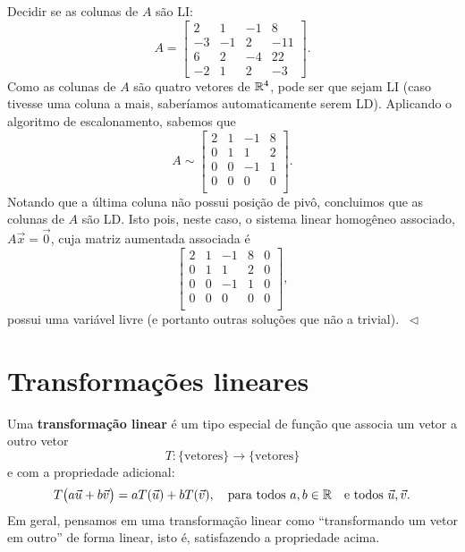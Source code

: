 \documentclass[../livro.tex]{subfiles}
\begin{document}
\begin{example}
Decidir se as colunas de $A$ são LI:
\begin{equation}
A = \left[
\begin{array}{rrrr}
   2&1&-1&8\\
   -3&-1&2&-11\\
   6&2&-4&22\\
   -2&1&2&-3
\end{array}
\right].
\end{equation} Como as colunas de $A$ são quatro vetores de $\mathbb{R}^4$, pode ser que sejam LI (caso tivesse uma coluna a mais, saberíamos automaticamente serem LD). Aplicando o algoritmo de escalonamento, sabemos que
\begin{equation}
A \sim \left[
\begin{array}{cccc}
   2&1&-1&8\\
   0&1&1&2\\
   0&0&-1&1\\
   0&0&0&0\\
\end{array}
\right].
\end{equation} Notando que a última coluna não possui posição de pivô, concluimos que as colunas de $A$ são LD. Isto pois, neste caso, o sistema linear homogêneo associado, $A \vec{x} = \vec{0}$, cuja matriz aumentada associada é
\begin{equation}
\left[
\begin{array}{cccc|c}
   2&1&-1&8&0\\
   0&1&1&2& 0\\
   0&0&-1&1&0\\
   0&0&0&0&0\\
\end{array}
\right],
\end{equation} possui uma variável livre (e portanto outras soluções que não a trivial). $\ \lhd$
\end{example}



\section{Transformações lineares}


Uma \textbf{transformação linear} é um tipo especial de função que associa um vetor a outro vetor
\begin{equation}
T: \{ \text{vetores} \} \to \{ \text{vetores} \}
\end{equation} e com a propriedade adicional:
\begin{equation}
T\big( a \vec{u} + b \vec{v} \big) = aT(\vec{u}) + bT(\vec{v}), \quad \text{para todos } a, b \in \mathbb{R} \quad \text{e todos } \vec{u}, \vec{v}.
\end{equation}
Em geral, pensamos em uma transformação linear como ``transformando um vetor em outro'' de forma linear, isto é, satisfazendo a propriedade acima.
\end{document}
